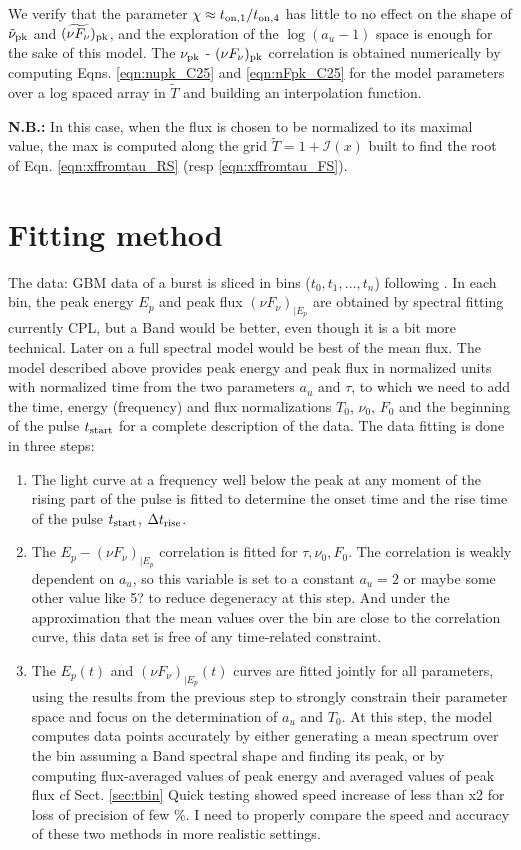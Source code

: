 \documentclass{article}
\newcommand\add[1]{{\color{orange}#1}}
\newcommand{\on}{{\rm on}}
\newcommand{\pk}{{\rm pk}}
\begin{document}
We verify that the parameter $\chi\approx t_{\on,1}/t_{\on,4}$ has little to no effect on the shape of $\tilde{\nu}_\pk$ and $(\widetilde{\nu F_\nu})_\pk$, and the exploration of the $\log(a_u-1)$ space is enough for the sake of this model. The $\nu_\pk$ - $(\nu F_\nu)_\pk$ correlation is obtained numerically by computing Eqns. \ref{eqn:nupk_C25} and \ref{eqn:nFpk_C25} for the model parameters over a log spaced array in $\tilde{T}$ and building an interpolation function. 

\textbf{N.B.:} In this case, when the flux is chosen to be normalized to its maximal value, the max is computed along the grid $\tilde{T}=1+\mathcal{I}(x)$ built to find the root of Eqn. \ref{eqn:xffromtau_RS} (resp \ref{eqn:xffromtau_FS}).

\section{Fitting method}
The data: GBM data of a burst is sliced in bins ($t_0, t_1,\dots,t_n$) following \cite{yang2023synchrotron, yan2024one}. In each bin, the peak energy $E_p$ and peak flux $(\nu F_\nu)_{|E_p}$ are obtained by spectral fitting \add{currently CPL, but a Band would be better, even though it is a bit more technical. Later on a full spectral model would be best} of the mean flux. The model described above provides peak energy and peak flux in normalized units with normalized time from the two parameters $a_u$ and $\tau$, to which we need to add the time, energy (frequency) and flux normalizations $T_0$, $\nu_0$, $F_0$ and the beginning of the pulse $t_{\rm start}$ for a complete description of the data. The data fitting is done in three steps:
\begin{enumerate}
    \item The light curve at a frequency well below the peak at any moment of the rising part of the pulse is fitted to determine the onset time and the rise time of the pulse $t_{\rm start}$, $\Delta t_{\rm rise}$.
    \item The $E_p - (\nu F_\nu)_{|E_p}$ correlation is fitted for $\tau, \nu_0, F_0$. The correlation is weakly dependent on $a_u$, so this variable is set to a constant $a_u=2$ \add{or maybe some other value like 5?} to reduce degeneracy at this step. And under the approximation that the mean values over the bin are close to the correlation curve, this data set is free of any time-related constraint.
    \item The $E_p(t)$ and $(\nu F_\nu)_{|E_p}(t)$ curves are fitted jointly for all parameters, using the results from the previous step to strongly constrain their parameter space and focus on the determination of $a_u$ and $T_0$. At this step, the model computes data points accurately by either generating a mean spectrum over the bin assuming a Band spectral shape and finding its peak, or by computing flux-averaged values of peak energy and averaged values of peak flux cf Sect. \ref{sec:tbin} \add{Quick testing showed speed increase of less than x2 for loss of precision of few \%. I need to properly compare the speed and accuracy of these two methods in more realistic settings.}
\end{enumerate}
\end{document}
